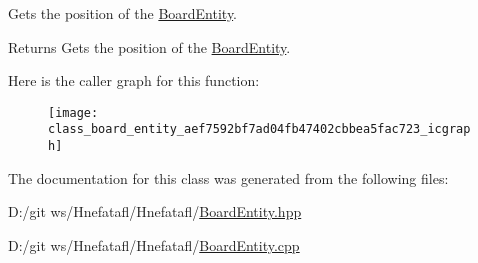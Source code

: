 Gets the position of the \hyperlink{class_board_entity}{Board\-Entity}. 

\begin{DoxyReturn}{Returns}
Gets the position of the \hyperlink{class_board_entity}{Board\-Entity}. 
\end{DoxyReturn}


Here is the caller graph for this function\-:\nopagebreak
\begin{figure}[H]
\begin{center}
\leavevmode
\texttt{[image: class\_board\_entity\_aef7592bf7ad04fb47402cbbea5fac723\_icgraph]}
\end{center}
\end{figure}




The documentation for this class was generated from the following files\-:\begin{DoxyCompactItemize}
\item 
D\-:/git ws/\-Hnefatafl/\-Hnefatafl/\hyperlink{_board_entity_8hpp}{Board\-Entity.\-hpp}\item 
D\-:/git ws/\-Hnefatafl/\-Hnefatafl/\hyperlink{_board_entity_8cpp}{Board\-Entity.\-cpp}\end{DoxyCompactItemize}
